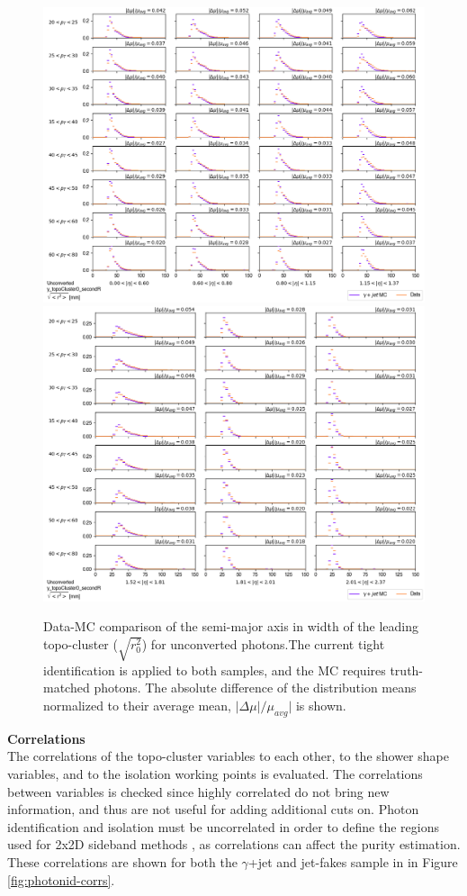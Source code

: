 \begin{figure}[!thp]
    \centering
    \includegraphics[width=.74\textwidth]{chapters/chapter4_photonID/images/y_topoCluster0_secondR_Unconverted_lowerEta.png}
    \includegraphics[width=.74\textwidth]{chapters/chapter4_photonID/images/y_topoCluster0_secondR_Unconverted_upperEta.png}
    \caption[Data-MC comparison of the semi-major axis in width of the leading topo-cluster ($\sqrt{r_0^2}$) for unconverted photons]{Data-MC comparison of the semi-major axis in width of the leading topo-cluster ($\sqrt{r_0^2}$) for unconverted photons.The current tight identification is applied to both samples, and the \gls{MC} requires truth-matched photons. The absolute difference of the distribution means normalized to their average mean, $|\Delta \mu|/\mu_{avg}|$ is shown.}
    \label{fig:data-mc-secondR}
\end{figure}

\noindent\textbf{Correlations}\\
\indent The correlations of the topo-cluster variables to each other, to the shower shape variables, and to the isolation working points is evaluated. The correlations between variables is checked since highly correlated do not bring new information, and thus are not useful for adding additional cuts on. Photon identification and isolation must be uncorrelated in order to define the regions used for 2x2D sideband methods \cite{2x2d-definition}, as correlations can affect the purity estimation. These correlations are shown for both the $\gamma$+jet and jet-fakes sample in in Figure \ref{fig:photonid-corrs}. 

